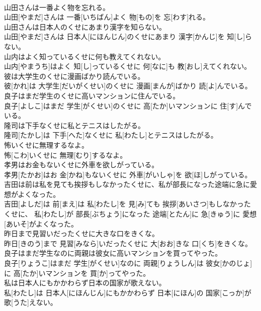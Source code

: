 \documentclass[8pt]{extreport}
\begin{document}
\begin{CJK}{UTF8}{min}
\\	山田さんは一番よく物を忘れる。	
\\	山田[やまだ]さんは 一番[いちばん]よく 物[もの]を 忘[わす]れる。
\\	山田さんは日本人のくせにあまり漢字を知らない。	
\\	山田[やまだ]さんは 日本人[にほんじん]のくせにあまり 漢字[かんじ]を 知[し]らない。
\\	山内はよく知っているくせに何も教えてくれない。	
\\	山内[やまうち]はよく 知[し]っているくせに 何[なに]も 教[おし]えてくれない。
\\	彼は大学生のくせに漫画ばかり読んでいる。	
\\	彼[かれ]は 大学生[だいがくせい]のくせに 漫画[まんが]ばかり 読[よ]んでいる。
\\	良子はまだ学生のくせに高いマンションに住んでいる。	
\\	良子[よしこ]はまだ 学生[がくせい]のくせに 高[たか]いマンションに 住[す]んでいる。
\\	隆司は下手なくせに私とテニスはしたがる。	
\\	隆司[たかし]は 下手[へた]なくせに 私[わたし]とテニスはしたがる。
\\	怖いくせに無理するなよ。	
\\	怖[こわ]いくせに 無理[むり]するなよ。
\\	孝男はお金もないくせに外車を欲しがっている。	
\\	孝男[たかお]はお 金[かね]もないくせに 外車[がいしゃ]を 欲[ほ]しがっている。
\\	吉田は前は私を見ても挨拶もしなかったくせに、私が部長になった途端に急に愛想がよくなった。	
\\	吉田[よしだ]は 前[まえ]は 私[わたし]を 見[み]ても 挨拶[あいさつ]もしなかったくせに、 私[わたし]が 部長[ぶちょう]になった 途端[とたん]に 急[きゅう]に 愛想[あいそ]がよくなった。
\\	昨日まで見習いだったくせに大きな口をきくな。	
\\	昨日[きのう]まで 見習[みなら]いだったくせに 大[おお]きな 口[くち]をきくな。
\\	良子はまだ学生なのに両親は彼女に高いマンションを買ってやった。	
\\	良子[りょうこ]はまだ 学生[がくせい]なのに 両親[りょうしん]は 彼女[かのじょ]に 高[たか]いマンションを 買[か]ってやった。
\\	私は日本人にもかかわらず日本の国家が歌えない。	
\\	私[わたし]は 日本人[にほんじん]にもかかわらず 日本[にほん]の 国家[こっか]が 歌[うた]えない。

\end{CJK}
\end{document}
